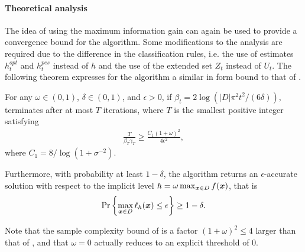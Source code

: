 \paragraph{Theoretical analysis}
The idea of using the maximum information gain can again be used to provide
a convergence bound for the \iacl algorithm. Some modifications to the analysis
are required due to the difference in the classification rules, i.e. the use
of estimates $h_t^{opt}$ and $h_t^{pes}$ instead of $h$ and the use of the
extended set $Z_t$ instead of $U_t$.
The following theorem expresses for the \iacl algorithm a similar in form bound
to that of .

\begin{theorem}
\label{thm:iacl}
For any $\omega \in (0, 1)$, $\delta \in (0, 1)$, and $\epsilon > 0$,
if $\beta_t = 2\log(|D|\pi^2 t^2/(6\delta))$, \iacl terminates after
at most $T$ iterations, where $T$ is the smallest positive integer
satisfying
\begin{align*}
\frac{T}{\beta_T \gamma_T} \geq \frac{C_1(1+\omega)^2}{4\epsilon^2},
\end{align*}
where $C_1 = 8/\log(1 + \sigma^{-2})$.

Furthermore, with probability at least $1-\delta$, the algorithm returns
an $\epsilon$-accurate solution with respect to the implicit level
$h = \omega \max_{\bm{x}\in D} f(\bm{x})$, that is
\begin{align*}
\Pr\left\{\max_{\bm{x}\in D}\ell_h(\bm{x}) \leq \epsilon\right\} \geq 1 - \delta.
\end{align*}
\end{theorem}

Note that the sample complexity bound of  is
a factor ${(1+\omega)^2\leq 4}$ larger than that of ,
and that $\omega=0$ actually reduces to an explicit threshold of $0$.

